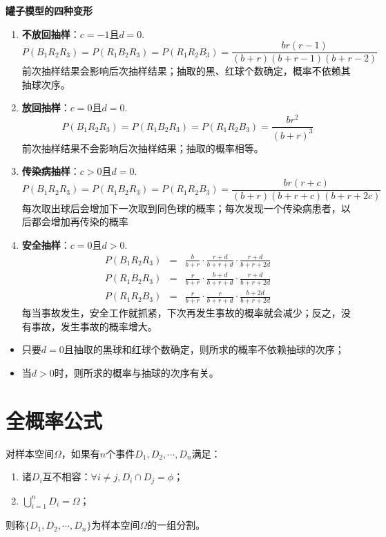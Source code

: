 \textbf{罐子模型的四种变形}
\begin{enumerate}
    \item \textbf{不放回抽样}：$c = -1$且$d = 0$.
    $$P(B_{1} R_{2}R_{3})=P(R_{1} B_{2}R_{3})=P(R_{1} R_{2}B_{3})=\frac{br(r-1)}{(b+r)(b+r-1)(b+r-2)} $$
    前次抽样结果会影响后次抽样结果；抽取的黑、红球个数确定，概率不依赖其抽球次序。
    \item \textbf{放回抽样}：$c = 0$且$d = 0$.
    $$P(B_{1} R_{2}R_{3})=P(R_{1} B_{2}R_{3})=P(R_{1} R_{2}B_{3})=\frac{br^{2} }{(b+r)^{3} } $$
    前次抽样结果不会影响后次抽样结果；抽取的概率相等。
    \item \textbf{传染病抽样}：$c > 0$且$d = 0$.
    $$P(B_{1} R_{2}R_{3})=P(R_{1} B_{2}R_{3})=P(R_{1} R_{2}B_{3})=\frac{br(r+c) }{(b+r)(b+r+c)(b+r+2c) } $$
    每次取出球后会增加下一次取到同色球的概率；每次发现一个传染病患者，以后都会增加再传染的概率
    \item \textbf{安全抽样}：$c = 0$且$d > 0$.
    \begin{eqnarray*}
    P(B_{1} R_{2}R_{3})&=&\frac{b }{b+r } \cdot \frac{r+d }{b+r+d }\cdot \frac{r+d }{b+r+2d }\\
    P(R_{1} B_{2}R_{3})&=&\frac{r }{b+r } \cdot \frac{b+d }{b+r+d }\cdot \frac{r+d }{b+r+2d }\\
    P(R_{1} R_{2}B_{3})&=&\frac{r }{b+r } \cdot \frac{r}{b+r+d }\cdot \frac{b+2d }{b+r+2d }
    \end{eqnarray*}
    每当事故发生，安全工作就抓紧，下次再发生事故的概率就会减少；反之，没有事故，发生事故的概率增大。
\end{enumerate}



\begin{remark}
\begin{itemize}
    \item 只要$d=0$且抽取的黑球和红球个数确定，则所求的概率不依赖抽球的次序；
    \item 当$d>0$时，则所求的概率与抽球的次序有关。
\end{itemize}
\end{remark}

\section{全概率公式}
\begin{definition}[样本空间的分割] \label{def: partition} 
对样本空间$\Omega$，如果有$n$个事件$D_{1},D_{2} ,\cdots ,D_{n} $满足：
\begin{enumerate}
    \item 诸$D_{i}$互不相容：$\forall i\ne j,D_{i}\cap  D_{j}=\phi $；
    \item $\bigcup_{i=1}^{n} D_{i}=\Omega $；
\end{enumerate}
则称$\{D_{1},D_{2},\cdots,D_{n}\}$为样本空间$\Omega$的一组分割。
\end{definition}

